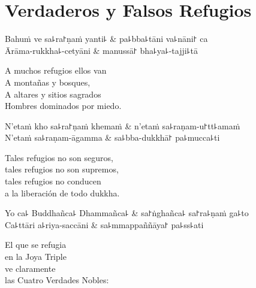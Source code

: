 \chapter{Verdaderos y Falsos Refugios}


\begin{leader}
\end{leader}

\begin{twochants}
  Bahuṁ ve sa꜕ra꜓ṇaṁ yanti꜕ & pa꜕bba꜕tāni va꜕nāni꜓ ca \\
  Ārāma-rukkha꜕-cetyāni & manussā꜓ bha꜕ya꜕-tajji꜕tā \\
\end{twochants}

\begin{english}
  A muchos refugios ellos van\\
  A montañas y bosques,\\
  A altares y sitios sagrados\\
  Hombres dominados por miedo.
\end{english}

\begin{twochants}
  N'etaṁ kho sa꜕ra꜓ṇaṁ khemaṁ & n'etaṁ sa꜕raṇam-u꜓tt꜕amaṁ \\
  N'etaṁ sa꜕raṇam-āgamma & sa꜕bba-dukkhā꜓ pa꜕mucca꜕ti \\
\end{twochants}

\begin{english}
  Tales refugios no son seguros,\\
  tales refugios no son supremos,\\
  tales refugios no conducen\\
  a la liberación de todo dukkha.
\end{english}

\begin{twochants}
  Yo ca꜕ Buddhañca꜕ Dhammañca꜕ & sa꜓ṅghañca꜕ sa꜓ra꜕ṇaṁ ga꜕to \\
  Ca꜕ttāri a꜕riya-saccāni & sa꜕mmappaññāya꜓ pa꜕ss꜕ati \\
\end{twochants}

\begin{english}
  El que se refugia\\
  en la Joya Triple\\
  ve claramente\\
  las Cuatro Verdades Nobles:
\end{english}

